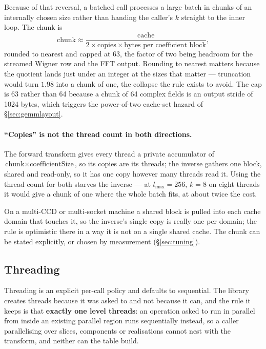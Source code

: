 \documentclass[11pt,a4paper]{article}
\begin{document}
Because of that reversal, a batched call processes a large batch in chunks
of an internally chosen size rather than handing the caller's $k$ straight
to the inner loop.  The chunk is
\begin{equation}
  \text{chunk} \approx \frac{\text{cache}}
    {2 \times \text{copies} \times \text{bytes per coefficient block}},
  \label{eq:chunk}
\end{equation}
rounded to nearest and capped at 63, the factor of two being headroom for
the streamed Wigner row and the FFT output.  Rounding to nearest matters
because the quotient lands just under an integer at the sizes that matter
--- truncation would turn $1.98$ into a chunk of one, the collapse the rule
exists to avoid.  The cap is 63 rather than 64 because a chunk of 64
complex fields is an output stride of 1024 bytes, which triggers the
power-of-two cache-set hazard of \S\ref{sec:gemmlayout}.

\paragraph{``Copies'' is not the thread count in both directions.}  The
forward transform gives every thread a private accumulator of
$\text{chunk}\times\text{coefficientSize}$, so its copies are its threads;
the inverse gathers one block, shared and read-only, so it has one copy
however many threads read it.  Using the thread count for both starves the
inverse --- at $l_{\max}=256$, $k=8$ on eight threads it would give a
chunk of one where the whole batch fits, at about twice the cost.

On a multi-CCD or multi-socket machine a shared block is pulled into each
cache domain that touches it, so the inverse's single copy is really one
per domain; the rule is optimistic there in a way it is not on a single
shared cache.  The chunk can be stated explicitly, or chosen by
measurement (\S\ref{sec:tuning}).

\subsection{Threading}

Threading is an explicit per-call policy and defaults to sequential.  The
library creates threads because it was asked to and not because it can,
and the rule it keeps is that \textbf{exactly one level threads}: an
operation asked to run in parallel from inside an existing parallel region
runs sequentially instead, so a caller parallelising over slices,
components or realisations cannot nest with the transform, and neither can
the table build.
\end{document}
